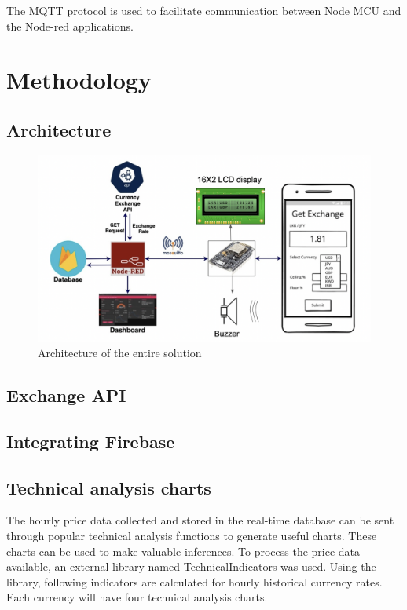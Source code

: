 The MQTT protocol is used to facilitate communication between Node MCU and the Node-red applications.


\section{Methodology}

\subsection{Architecture}

\begin{figure}[h]
    \centering
      \includegraphics[width=1\textwidth]{images/arch.png}
    \caption{Architecture of the entire solution}
    \label{fig:arch}
\end{figure}

\subsection{Exchange API}

\subsection{Integrating Firebase}

\subsection{Technical analysis charts}

The hourly price data collected and stored in the real-time database can be sent through popular technical analysis functions to generate useful charts. These charts can be used to make valuable inferences. To process the price data available, an external library named TechnicalIndicators was used. Using the library, following indicators are calculated for hourly historical currency rates. Each currency will have four technical analysis charts.

